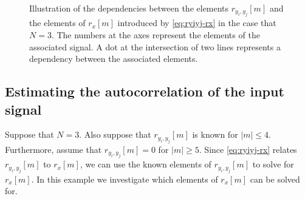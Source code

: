 \documentclass[a4paper, openany, oneside]{memoir}
\begin{document}
\begin{figure}[H]
    \centering
    \caption{Illustration of the dependencies between the elements $r_{y_i,y_j}[m]$ and the elements of $r_x[m]$ introduced by \cref{eq:ryiyj-rx} in the case that $N=3$. The numbers at the axes represent the elements of the associated signal. A dot at the intersection of two lines represents a dependency between the associated elements.}
    \label{fig:visualisation-ryiyj-rx}
\end{figure}


\subsection{Estimating the autocorrelation of the input signal}
 Suppose that $N=3$. Also suppose that $r_{y_i,y_j}[m]$ is known for $|m| \le 4$. Furthermore, assume that $r_{y_i,y_j}[m]=0$ for $|m| \ge 5$. Since \cref{eq:ryiyj-rx} relates $r_{y_i,y_j}[m]$ to $r_x[m]$, we can use the known elements of $r_{y_i,y_j}[m]$ to solve for $r_x[m]$. In this example we investigate which elements of $r_x[m]$ can be solved for.
\end{document}
